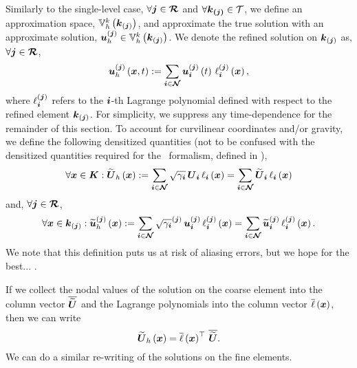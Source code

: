 Similarly to the single-level case,
$\forall \boldsymbol{j}\in\boldsymbol{\mathcal{R}}$
and $\forall\boldsymbol{\boldsymbol{k}_{\left(\boldsymbol{j}\right)}}\in\mathcal{T}$,
we define an approximation space,
$\mathbb{V}_{h}^{k}\left(\boldsymbol{k}_{\left(\boldsymbol{j}\right)}\right)$,
and approximate the true solution with an approximate solution,
$\boldsymbol{u}_{h}^{\left(\boldsymbol{j}\right)}
\in\mathbb{V}_{h}^{k}\left(\boldsymbol{k}_{\left(\boldsymbol{j}\right)}\right)$.
We denote the refined solution on $\boldsymbol{k}_{\left(\boldsymbol{j}\right)}$ as,
$\forall\boldsymbol{j}\in\boldsymbol{\mathcal{R}}$,
\begin{equation}
  \boldsymbol{u}^{\left(\boldsymbol{j}\right)}_{h}\left(\boldsymbol{x},t\right)
  :=\sum\limits_{\boldsymbol{i}\in\boldsymbol{\mathcal{N}}}
  \boldsymbol{u}^{\left(\boldsymbol{j}\right)}_{\boldsymbol{i}}\left(t\right)\,
  \ell^{\left(\boldsymbol{j}\right)}_{\boldsymbol{i}}\left(\boldsymbol{x}\right),
\end{equation}
where $\ell^{\left(\boldsymbol{j}\right)}_{\boldsymbol{i}}$ refers to the $\boldsymbol{i}$-th
Lagrange polynomial defined with respect to the refined element
$\boldsymbol{k}_{\left(\boldsymbol{j}\right)}$.
For simplicity, we suppress any time-dependence for the remainder
of this section.
To account for curvilinear coordinates and/or gravity, we define
the following densitized quantities
(not to be confused with the densitized
quantities required for the \xcfc\ formalism, defined in
),
\begin{equation}
  \forall\boldsymbol{x}\in\boldsymbol{K}:\widetilde{\boldsymbol{U}}_{h}\left(\boldsymbol{x}\right)
  :=\sum\limits_{\boldsymbol{i}\in\boldsymbol{\mathcal{N}}}
  \sqrt{\gamma_{\boldsymbol{i}}}\,
  \boldsymbol{U}_{\boldsymbol{i}}\,\ell_{\boldsymbol{i}}\left(\boldsymbol{x}\right)
  =\sum\limits_{\boldsymbol{i}\in\boldsymbol{\mathcal{N}}}
  \widetilde{\boldsymbol{U}}_{\boldsymbol{i}}\,\ell_{\boldsymbol{i}}\left(\boldsymbol{x}\right)
  \label{eq.crseSoln}
\end{equation}
and, $\forall\boldsymbol{j}\in\boldsymbol{\mathcal{R}}$,
\begin{equation}
  \forall\boldsymbol{x}\in\boldsymbol{k}_{\left(\boldsymbol{j}\right)}:\widetilde{\boldsymbol{u}}^{\left(\boldsymbol{j}\right)}_{h}\left(\boldsymbol{x}\right)
  :=\sum\limits_{\boldsymbol{i}\in\boldsymbol{\mathcal{N}}}
  \sqrt{\gamma_{\boldsymbol{i}}}^{\left(\boldsymbol{j}\right)}\,
  \boldsymbol{u}^{\left(\boldsymbol{j}\right)}_{\boldsymbol{i}}\,
  \ell^{\left(\boldsymbol{j}\right)}_{\boldsymbol{i}}\left(\boldsymbol{x}\right)
  =\sum\limits_{\boldsymbol{i}\in\boldsymbol{\mathcal{N}}}
  \widetilde{\boldsymbol{u}}^{\left(\boldsymbol{j}\right)}_{\boldsymbol{i}}\,
  \ell^{\left(\boldsymbol{j}\right)}_{\boldsymbol{i}}\left(\boldsymbol{x}\right).
  \label{eq.refSoln}
\end{equation}
We note that this definition puts us at risk of aliasing errors,
but we hope for the best...
.

If we collect the nodal values of the solution on the coarse element
into the column vector $\overline{\widetilde{\boldsymbol{U}}}$ and the
Lagrange polynomials into the column vector $\overline{\ell}\left(\boldsymbol{x}\right)$,
then we can write
\begin{equation}
  \widetilde{\boldsymbol{U}}_{h}\left(\boldsymbol{x}\right)
  =\overline{\ell}\left(\boldsymbol{x}\right)^{\top}\,\overline{\widetilde{\boldsymbol{U}}}.
\end{equation}
We can do a similar re-writing of the solutions on the fine elements.

